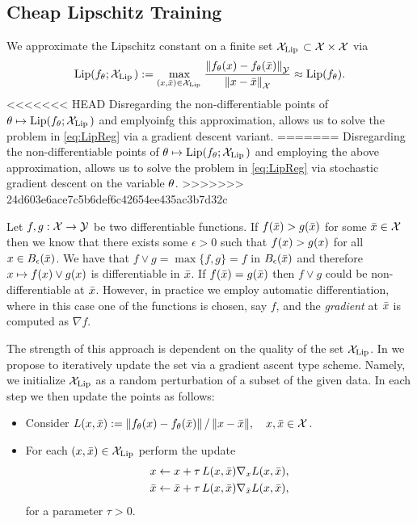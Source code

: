 \subsection{Cheap Lipschitz Training}
We approximate the Lipschitz constant on a finite set $\mathcal{X}_{\operatorname{Lip}{}}\subset\mathcal{X}\times\mathcal{X}$ via
%
\begin{align*}
\operatorname{Lip}(f_\theta; \mathcal{X}_{\operatorname{Lip}{}}) := 
\max_{(x,\bar{x})\in\mathcal{X}_{\operatorname{Lip}{}}} \frac{\left\|f_\theta(x)-f_\theta(\bar{x})\right\|_{\mathcal{\mathcal{Y}}}}{\left\|x-\bar{x}\right\|_{\mathcal{X}}}
\approx
\operatorname{Lip}(f_\theta).
\end{align*}
%
%
<<<<<<< HEAD
Disregarding the non-differentiable points of $\theta\mapsto \operatorname{Lip}(f_\theta; \mathcal{X}_{\operatorname{Lip}{}})$ and emplyoinfg this approximation, allows us to solve the problem in \cref{eq:LipReg} via a gradient descent variant.
=======
Disregarding the non-differentiable points of $\theta\mapsto \operatorname{Lip}(f_\theta; \mathcal{X}_{\operatorname{Lip}{}})$ and employing the above approximation, allows us to solve the problem in \cref{eq:LipReg} via stochastic gradient descent on the variable $\theta$.
>>>>>>> 24d603e6ace7c5b6def6c42654ee435ac3b7d32c
%
\begin{remark}{}{}
Let $f,g:\mathcal{X}\to\mathcal{\mathcal{Y}}$ be two differentiable functions. If $f(\bar{x})>g(\bar{x})$ for some $\bar{x}\in\mathcal{X}$ then we know that there exists some $\epsilon>0$ such that $f(x)>g(x)$ for all $x\in B_\epsilon(\bar{x})$. We have that $f\vee g = \max\{f,g\} = f$ in $B_\epsilon(\bar{x})$ and therefore $x\mapsto f(x)\vee g(x)$ is differentiable in $\bar{x}$. If $f(\bar{x})=g(\bar{x})$ then $f\vee g$ could be non-differentiable at $\bar{x}$. However, in practice we employ automatic differentiation, where in this case one of the functions is chosen, say $f$, and the \emph{gradient} at $\bar{x}$ is computed as $\nabla f$. 
\end{remark}
%
%
\noindent%
The strength of this approach is dependent on the quality of the set $\mathcal{X}_{\operatorname{Lip}}$. In \cite{bungert2021clip} we propose to iteratively update the set via a gradient ascent type scheme. Namely, we initialize $\mathcal{X}_{\operatorname{Lip}}$ as a random perturbation of a subset of the given data. In each step we then update the points as follows:
\begin{itemize}
\item Consider $L(x,\bar{x}) := {\left\|f_\theta(x)-f_\theta(\bar{x})\right\|}\,/\,{\left\|x-\bar{x}\right\|},\quad x,\bar{x}\in\mathcal{X}$.
\item For each $(x,\bar{x})\in\mathcal{X}_{\operatorname{Lip}}$ perform the update 
%
\begin{align*}
x &\gets x + \tau\,L(x,\bar{x}) \nabla_{x} L(x,\bar{x}),\\
\bar{x} &\gets \bar{x} + \tau\,L(x,\bar{x}) \nabla_{\bar{x}} L(x,\bar{x}),
\end{align*}
%
for a parameter $\tau>0$.
\end{itemize}
